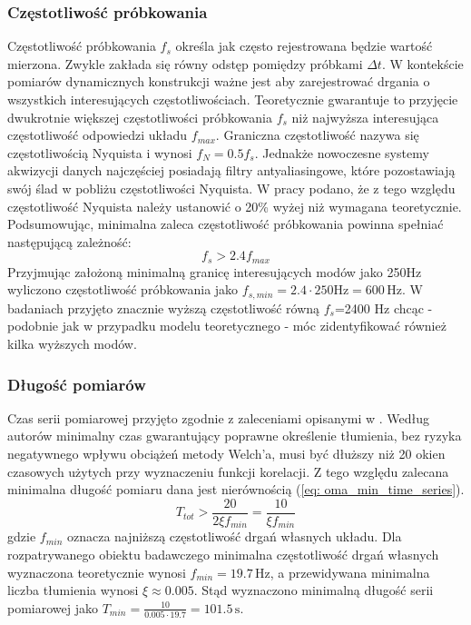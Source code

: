 \subsubsection{Częstotliwość próbkowania}
Częstotliwość próbkowania $f_s$ określa jak często rejestrowana będzie wartość mierzona. Zwykle zakłada się równy odstęp pomiędzy próbkami $\Delta t$. W kontekście pomiarów dynamicznych konstrukcji ważne jest aby zarejestrować drgania o wszystkich interesujących częstotliwościach. Teoretycznie gwarantuje to przyjęcie dwukrotnie większej częstotliwości próbkowania $f_s$ niż najwyższa interesująca częstotliwość odpowiedzi układu $f_{max}$. Graniczna częstotliwość nazywa się częstotliwością Nyquista i wynosi $f_N = 0.5f_s$. Jednakże nowoczesne systemy akwizycji danych najczęściej posiadają filtry antyaliasingowe, które pozostawiają swój ślad w pobliżu częstotliwości Nyquista. W pracy \cite{Brincker2015} podano, że z tego względu częstotliwość Nyquista należy ustanowić o 20\% wyżej niż wymagana teoretycznie. Podsumowując, minimalna zaleca częstotliwość próbkowania powinna spełniać następującą zależność:
\begin{equation} \label{eq: oma_min_sampling}
	f_s > 2.4 f_{max}
\end{equation}
Przyjmując założoną minimalną granicę interesujących modów jako 250Hz wyliczono częstotliwość próbkowania jako $f_{s,min}=2.4\cdot250\text{Hz}=600\,\text{Hz}.$ W badaniach przyjęto znacznie wyższą częstotliwość równą $f_s$=2400 Hz chcąc - podobnie jak w przypadku modelu teoretycznego - móc zidentyfikować również kilka wyższych modów.
\subsubsection{Długość pomiarów}
Czas serii pomiarowej przyjęto zgodnie z zaleceniami opisanymi w \cite{Brincker2015}. Według autorów minimalny czas gwarantujący poprawne określenie tłumienia, bez ryzyka negatywnego wpływu obciążeń metody Welch'a, musi być dłuższy niż 20 okien czasowych użytych przy wyznaczeniu funkcji korelacji. Z tego względu zalecana minimalna długość pomiaru dana jest nierównością (\ref{eq: oma_min_time_series}).
\begin{equation} \label{eq: oma_min_time_series}
	T_{tot} > \frac{20}{2\xi f_{min}}=\frac{10}{\xi f_{min}}
\end{equation}
gdzie $f_{min}$ oznacza najniższą częstotliwość drgań własnych układu. Dla rozpatrywanego obiektu badawczego minimalna częstotliwość drgań własnych wyznaczona teoretycznie wynosi $f_{min}=19.7\,\text{Hz}$, a przewidywana minimalna liczba tłumienia wynosi $\xi \approx 0.005$. Stąd wyznaczono minimalną długość serii pomiarowej jako $T_{min} = \frac{10}{0.005\cdot 19.7} = 101.5\,\text{s}$. 

